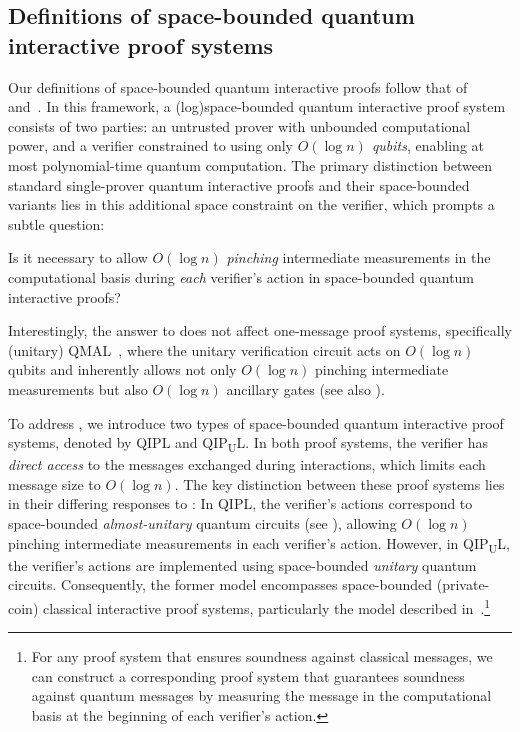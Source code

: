 \documentclass[11pt, a4paper]{article}
\numberwithin{equation}{section}
\numberwithin{figure}{section}
\newcommand{\QIPL}{\textnormal{\textsf{QIPL}}\xspace}
\newcommand{\QMAL}{\textnormal{\textsf{QMAL}}\xspace}
\newcommand{\QIPUL}{\texorpdfstring{\textnormal{\textsf{QIP}\textsubscript{\textnormal{U}}\textsf{L}}}\xspace}
\begin{document}
\subsection{Definitions of space-bounded quantum interactive proof systems}
\label{subsec:QIPL-definition}

Our definitions of space-bounded quantum interactive proofs follow that of~\cite[Section 2.3]{KW00} and~\cite[Section 2.3]{Wat02QSZK}. In this framework, a (log)space-bounded quantum interactive proof system consists of two parties: an untrusted prover with unbounded computational power, and a verifier constrained to using only \textit{$O(\log n)$ qubits}, enabling at most polynomial-time quantum computation. 
The primary distinction between standard single-prover quantum interactive proofs and their space-bounded variants lies in this additional space constraint on the verifier, which prompts a subtle question: 
\begin{problem}
    \label{prob:subtlety-in-intermediate-measurements}
    Is it necessary to allow $O(\log n)$ \emph{pinching} intermediate measurements in the computational basis during \emph{each} verifier's action in space-bounded quantum interactive proofs?
\end{problem}
Interestingly, the answer to  does not affect one-message proof systems, specifically (unitary) \QMAL{}~\cite{FKLMN16,FR21}, where the unitary verification circuit acts on $O(\log n)$ qubits and inherently allows not only $O(\log n)$ pinching intermediate measurements but also $O(\log n)$ ancillary gates (see also ). 

To address , we introduce two types of space-bounded quantum interactive proof systems, denoted by \QIPL{} and \QIPUL{}. 
In both proof systems, the verifier has \textit{direct access} to the messages exchanged during interactions, which limits each message size to $O(\log n)$. 
The key distinction between these proof systems lies in their differing responses to : In \QIPL{}, the verifier's actions correspond to space-bounded \textit{almost-unitary} quantum circuits (see ), allowing $O(\log{n})$ pinching intermediate measurements in each verifier's action. 
However, in \QIPUL{}, the verifier's actions are implemented using space-bounded \textit{unitary} quantum circuits. 
Consequently, the former model encompasses space-bounded (private-coin) classical interactive proof systems, particularly the model described in~\cite{CL95}.\footnote{For any proof system that ensures soundness against classical messages, we can construct a corresponding proof system that guarantees soundness against quantum messages by measuring the message in the computational basis at the beginning of each verifier's action.}
\end{document}
